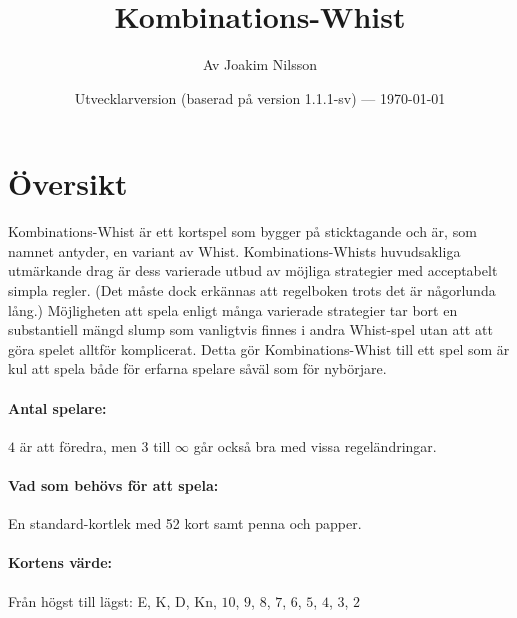 \documentclass[a4paper]{article}
\title{Kombinations-Whist}
\author{Av Joakim Nilsson}
\date{Utvecklarversion (baserad på version 1.1.1-sv) --- \today}
\begin{document}
	\introPages

	\section{Översikt}{%
		Kombinations-Whist är ett kortspel som bygger på sticktagande och är, som namnet antyder, en variant av Whist. Kombinations-Whists huvudsakliga utmärkande drag är dess varierade utbud av möjliga strategier med acceptabelt simpla regler. (Det måste dock erkännas att regelboken trots det är någorlunda lång.) Möjligheten att spela enligt många varierade strategier tar bort en substantiell mängd slump som vanligtvis finnes i andra Whist-spel utan att att göra spelet alltför komplicerat. Detta gör Kombinations-Whist till ett spel som är kul att spela både för erfarna spelare såväl som för nybörjare.

		\paragraph{Antal spelare:}
		$4$ är att föredra, men $3$ till $\infty$ går också bra med vissa regeländringar.

		\paragraph{Vad som behövs för att spela:}
		En standard-kortlek med 52 kort samt penna och papper.

		\paragraph{Kortens värde:}
		Från högst till lägst: E, K, D, Kn, $10$, $9$, $8$, $7$, $6$, $5$, $4$, $3$, $2$
	}
\end{document}
